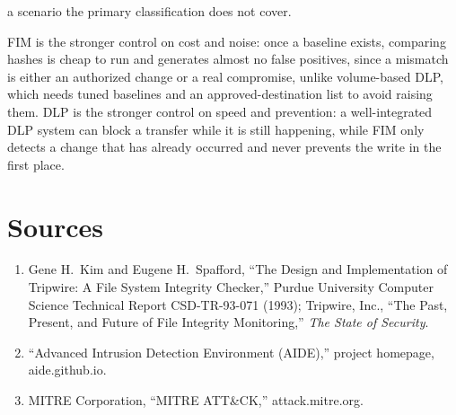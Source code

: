 \begin{answerkey}
a scenario the primary classification does not cover.
\item FIM is the stronger control on cost and noise: once a baseline exists, comparing hashes is
cheap to run and generates almost no false positives, since a mismatch is either an authorized
change or a real compromise, unlike volume-based DLP, which needs tuned baselines and an
approved-destination list to avoid raising them. DLP is the stronger control on speed and
prevention: a well-integrated DLP system can block a transfer while it is still happening, while FIM
only detects a change that has already occurred and never prevents the write in the first place.
\end{answerkey}

\section*{Sources}
\begin{enumerate}[label=\lbrack\arabic*\rbrack, leftmargin=2.2em]
\item {}Gene H.\ Kim and Eugene H.\ Spafford, ``The Design and Implementation of
Tripwire: A File System Integrity Checker,'' Purdue University Computer Science Technical Report
CSD-TR-93-071 (1993); Tripwire, Inc., ``The Past, Present, and Future of File Integrity Monitoring,''
\emph{The State of Security}.
\item {}``Advanced Intrusion Detection Environment (AIDE),'' project homepage,
aide.github.io.
\item {}MITRE Corporation, ``MITRE ATT\&CK\textregistered,'' attack.mitre.org.
\end{enumerate}

